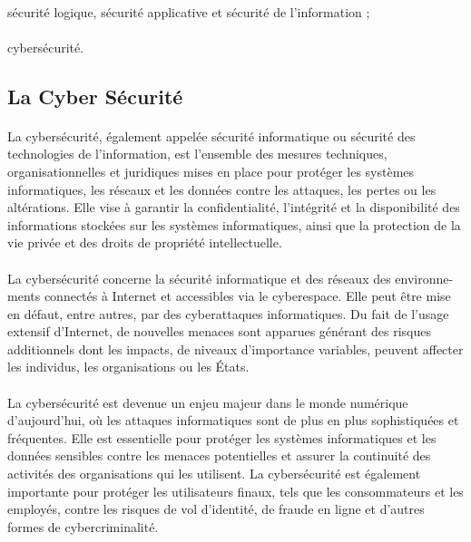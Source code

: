 \documentclass{report}
\begin{document}
 \paragraph{ }
   \textendash \space  sécurité logique, sécurité applicative et sécurité de l’information ;
   
   \paragraph{ }
   \textendash \space cybersécurité.
   
  \subsection{ La Cyber Sécurité }
  \paragraph{ }
  La cybersécurité, également appelée sécurité informatique ou sécurité des technologies de l'information, est l'ensemble des mesures techniques, organisationnelles et juridiques mises en place pour protéger les systèmes informatiques, les réseaux et les données contre les attaques, les pertes ou les altérations. Elle vise à garantir la confidentialité, l'intégrité et la disponibilité des informations stockées sur les systèmes informatiques, ainsi que la protection de la vie privée et des droits de propriété intellectuelle.
  \paragraph{ }
  La cybersécurité concerne la sécurité informatique et des réseaux des environne-
ments connectés à Internet et accessibles via le cyberespace. Elle peut être mise en
défaut, entre autres, par des cyberattaques informatiques. Du fait de l’usage extensif
d’Internet, de nouvelles menaces sont apparues générant des risques additionnels
dont les impacts, de niveaux d’importance variables, peuvent affecter les individus,
les organisations ou les États. 
   \paragraph{ }
  La cybersécurité est devenue un enjeu majeur dans le monde numérique d'aujourd'hui, où les attaques informatiques sont de plus en plus sophistiquées et fréquentes. Elle est essentielle pour protéger les systèmes informatiques et les données sensibles contre les menaces potentielles et assurer la continuité des activités des organisations qui les utilisent. La cybersécurité est également importante pour protéger les utilisateurs finaux, tels que les consommateurs et les employés, contre les risques de vol d'identité, de fraude en ligne et d'autres formes de cybercriminalité.
\end{document}
